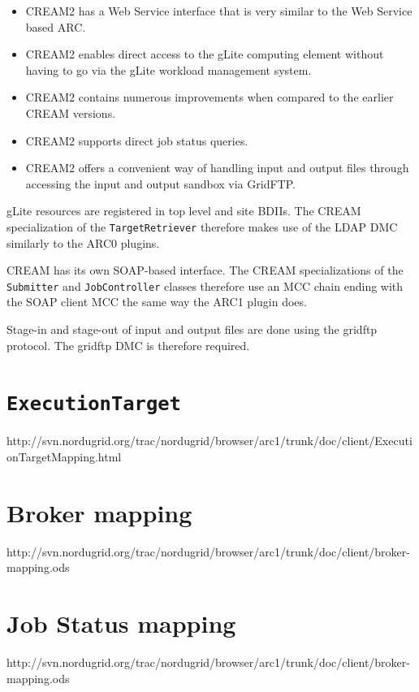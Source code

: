 \documentclass{book}
\newcommand{\ExecutionTarget}{\texttt{ExecutionTarget}}
\newcommand{\JobController}{\texttt{JobController}}
\newcommand{\TargetRetriever}{\texttt{TargetRetriever}}
\newcommand{\Submitter}{\texttt{Submitter}}
\begin{document}
\begin{itemize}
\item CREAM2 has a Web Service interface that is very similar to the Web Service
  based ARC.
\item CREAM2 enables direct access to the gLite computing element
  without having to go via the gLite workload management system.
\item CREAM2 contains numerous improvements when compared to the
  earlier CREAM versions.
\item CREAM2 supports direct job status queries.
\item CREAM2 offers a convenient way of handling input and output
  files through accessing the input and output sandbox via GridFTP.
\end{itemize}

gLite resources are registered in top level and site BDIIs. The CREAM
specialization of the {\TargetRetriever} therefore makes use of the
LDAP DMC similarly to the ARC0 plugins.

CREAM has its own SOAP-based interface. The CREAM
specializations of the {\Submitter} and {\JobController} classes
therefore use an MCC chain ending with the SOAP client MCC the same 
way the ARC1 plugin does.

Stage-in and stage-out of input and output files are done using the
gridftp protocol. The gridftp DMC is therefore required.

\appendix

\chapter{{\ExecutionTarget}}
\label{app:ExTarget}

http://svn.nordugrid.org/trac/nordugrid/browser/arc1/trunk/doc/client/ExecutionTargetMapping.html

\chapter{Broker mapping}
\label{app:broker-mapping}

http://svn.nordugrid.org/trac/nordugrid/browser/arc1/trunk/doc/client/broker-mapping.ods

\chapter{Job Status mapping}
\label{app:broker-mapping}

http://svn.nordugrid.org/trac/nordugrid/browser/arc1/trunk/doc/client/broker-mapping.ods



\end{document}
